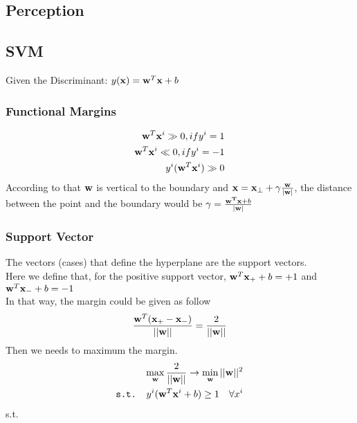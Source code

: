 \documentclass[12pt,a4paper]{article}
\begin{document}
\subsection*{Perception}
\subsection*{SVM}
Given the Discriminant: $y({\bf x}) = {\bf w}^T{\bf x}+b$
\subsubsection*{Functional Margins}
\begin{eqnarray*}
{\bf w}^T{\bf x}^i \gg0, if y^i = 1\\
{\bf w}^T{\bf x}^i \ll0, if y^i = -1\\
y^i({\bf w}^T{\bf x}^i) \gg 0
\end{eqnarray*}
According to that ${\bf w}$ is vertical to the boundary and ${\bf x} = {\bf x}_{\perp}+\gamma\frac{\bf w}{\bf |w|}$, the distance between the point and the boundary would be $\gamma = \frac{{\bf w^T}{\bf x}+b}{|{\bf w}|}$
\subsubsection*{Support Vector}
The vectors (cases) that define the hyperplane are the support vectors.\\
Here we define that, for the positive support vector, ${\bf w}^T{\bf x}_++b=+1$ and ${\bf w}^T{\bf x}_-+b=-1$\\
In that way, the margin could be given as follow
$$
\frac{{\bf w}^T({\bf x}_+-{\bf x}_-)}{||\bf w||} = \frac{2}{||\bf w||}
$$
Then we needs to maximum the margin.
\begin{eqnarray*}
\max_{\bf w} \frac{2}{||\bf w||} \rightarrow \min_{\bf w}||{\bf w}||^2\\
\texttt{s.t. } y^i({\bf w}^T{\bf x}^i+b)\ge 1  \quad  \forall x^i
\end{eqnarray*}
s.t. 
\end{document}
